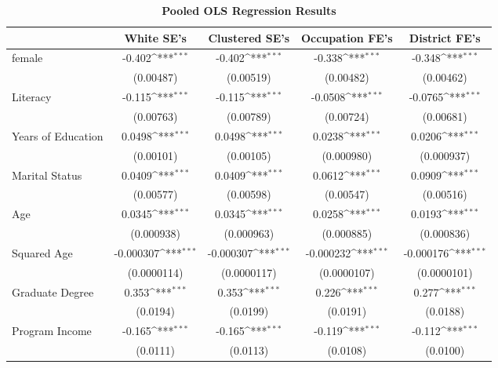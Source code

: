\begin{table}[htbp]\centering
\def\sym#1{\ifmmode^{#1}\else\(^{#1}\)\fi}
\caption{\textbf{Pooled OLS Regression Results}}
\begin{tabular}{l*{4}{c}}
\hline\hline
                &\multicolumn{1}{c}{\textbf{White SE's}}&\multicolumn{1}{c}{\textbf{Clustered SE's}}&\multicolumn{1}{c}{\textbf{Occupation FE's}}&\multicolumn{1}{c}{\textbf{District FE's}}\\
\hline
female          &   -0.402\sym{***}&   -0.402\sym{***}&   -0.338\sym{***}&   -0.348\sym{***}\\
                &(0.00487)         &(0.00519)         &(0.00482)         &(0.00462)         \\
[1em]
Literacy        &   -0.115\sym{***}&   -0.115\sym{***}&  -0.0508\sym{***}&  -0.0765\sym{***}\\
                &(0.00763)         &(0.00789)         &(0.00724)         &(0.00681)         \\
[1em]
Years of Education&   0.0498\sym{***}&   0.0498\sym{***}&   0.0238\sym{***}&   0.0206\sym{***}\\
                &(0.00101)         &(0.00105)         &(0.000980)         &(0.000937)         \\
[1em]
Marital Status  &   0.0409\sym{***}&   0.0409\sym{***}&   0.0612\sym{***}&   0.0909\sym{***}\\
                &(0.00577)         &(0.00598)         &(0.00547)         &(0.00516)         \\
[1em]
Age             &   0.0345\sym{***}&   0.0345\sym{***}&   0.0258\sym{***}&   0.0193\sym{***}\\
                &(0.000938)         &(0.000963)         &(0.000885)         &(0.000836)         \\
[1em]
Squared Age     &-0.000307\sym{***}&-0.000307\sym{***}&-0.000232\sym{***}&-0.000176\sym{***}\\
                &(0.0000114)         &(0.0000117)         &(0.0000107)         &(0.0000101)         \\
[1em]
Graduate Degree &    0.353\sym{***}&    0.353\sym{***}&    0.226\sym{***}&    0.277\sym{***}\\
                & (0.0194)         & (0.0199)         & (0.0191)         & (0.0188)         \\
[1em]
Program Income  &   -0.165\sym{***}&   -0.165\sym{***}&   -0.119\sym{***}&   -0.112\sym{***}\\
                & (0.0111)         & (0.0113)         & (0.0108)         & (0.0100)         \\

\end{tabular}
\end{table}
